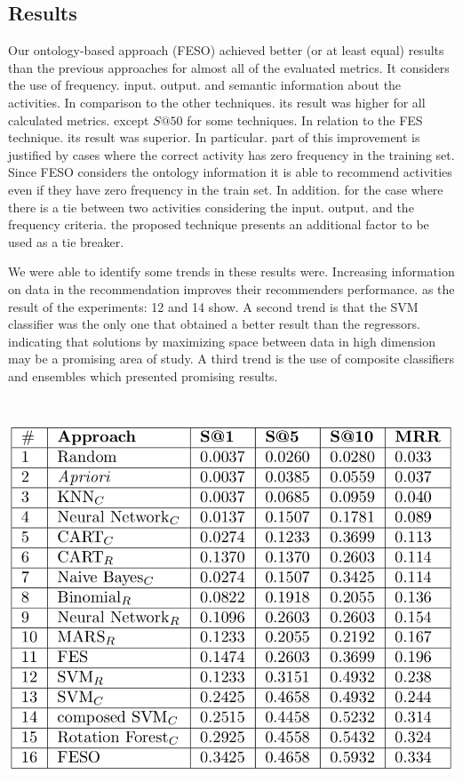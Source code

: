 \documentclass[40pt, a0, portrait]{a0poster}
\begin{document}
\begin{multicols}{2}
\section*{Results}
Our ontology-based approach (FESO) achieved better (or at least equal) results than the previous approaches for almost all of the evaluated metrics. It considers the use of frequency. input. output. and semantic information about the activities. In comparison to the other techniques. its result was higher for all calculated metrics. except \(S@50\) for some techniques. In relation to the FES technique. its result was superior. In particular. part of this improvement is justified by cases where the correct activity has zero frequency in the training set. Since FESO considers the ontology information it is able to recommend activities even if they have zero frequency in the train set. In addition. for the case where there is a tie between two activities considering the input. output. and the frequency criteria. the proposed technique presents an additional factor to be used as a tie breaker.

We were able to identify some trends in these results were. Increasing information on data in the recommendation improves their recommenders performance. as the result of the experiments: 12 and 14 show. A second trend is that the SVM classifier was the only one that obtained a better result than the regressors. indicating that solutions by maximizing space between data in high dimension may be a promising area of study. A third trend is the use of composite classifiers and ensembles which presented promising results. 

\begin{center}\vspace{1cm}
\includegraphics[height=12cm, width=28cm]{resultados.png}
\end{center}\vspace{1cm}


\end{multicols}
\end{document}
